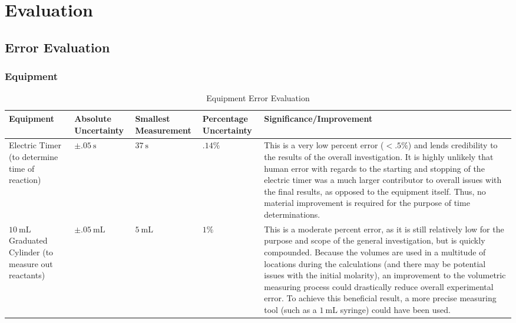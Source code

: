 \section{Evaluation}

\subsection{Error Evaluation}

\subsubsection{Equipment}

\begin{table}[h!]
\centering

\begin{tabular}{|p{2.3cm}|p{1.5cm}|p{1.7cm}|p{1.5cm}|p{9.5cm}|}
\hline 
 Equipment & Absolute \newline Uncertainty & Smallest \newline Measurement & Percentage \newline Uncertainty & Significance/Improvement\\
 \hline
 Electric Timer (to determine time of reaction) & $\pm \SI{.05}{\second}$ & $\SI{37}{\second}$ & $.14\%$ & This is a very low percent error ($< .5\%$) and lends credibility to the results of the overall investigation. It is highly unlikely that human error with regards to the starting and stopping of the electric timer was a much larger contributor to overall issues with the final results, as opposed to the equipment itself. Thus, no material improvement is required for the purpose of time determinations. \\
 \hline
 $\SI{10}{\milli\liter}$ Graduated Cylinder (to measure out reactants) & $\pm \SI{.05}{\milli\liter}$ & $\SI{5}{\milli\liter}$ & $1\%$ & This is a moderate percent error, as it is still relatively low for the purpose and scope of the general investigation, but is quickly compounded. Because the volumes are used in a multitude of locations during the calculations (and there may be potential issues with the initial molarity), an improvement to the volumetric measuring process could drastically reduce overall experimental error. To achieve this beneficial result, a more precise measuring tool (such as a $\SI{1}{\milli\liter}$ syringe) could have been used.\\
 \hline

\end{tabular}
\caption{Equipment Error Evaluation}
\label{table:equipment_error_evaluation}
\end{table}

